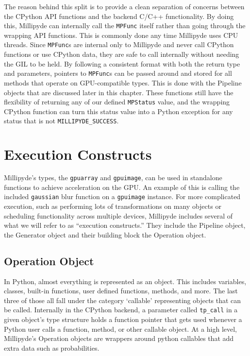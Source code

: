 \quad The reason behind this split is to provide a clean separation of concerns between the CPython API functions and the backend C/C++ functionality. By doing this, Millipyde can internally call the \verb|MPFunc| itself rather than going through the wrapping API functions. This is commonly done any time Millipyde uses CPU threads. Since \verb|MPFunc|s are internal only to Millipyde and never call CPython functions or use CPython data, they are safe to call internally without needing the GIL to be held. By following a consistent format with both the return type and parameters, pointers to \verb|MPFunc|s can be passed around and stored for all methods that operate on GPU-compatible types. This is done with the Pipeline objects that are discussed later in this chapter. These functions still have the flexibility of returning any of our defined \verb|MPStatus| value, and the wrapping CPython function can turn this status value into a Python exception for any status that is not \verb|MILLIPYDE_SUCCESS|.


\section{Execution Constructs}

Millipyde's types, the \verb|gpuarray| and \verb|gpuimage|, can be used in standalone functions to achieve acceleration on the GPU. An example of this is calling the included \verb|gaussian| blur function on a \verb|gpuimage| instance. For more complicated execution, such as performing lots of transformations on many objects or scheduling functionality across multiple devices, Millipyde includes several of what we will refer to as ``execution constructs.'' They include the Pipeline object, the Generator object and their building block the Operation object.

\subsection{Operation Object}

In Python, almost everything is represented as an object. This includes variables, classes, built-in functions, user defined functions, methods, and more. The last three of those all fall under the category `callable' representing objects that can be called. Internally in the CPython backend, a parameter called \verb|tp_call| in a given object's type structure holds a function pointer that gets used whenever a Python user calls a function, method, or other callable object. At a high level, Millipyde's Operation objects are wrappers around python callables that add extra data such as probabilities.

